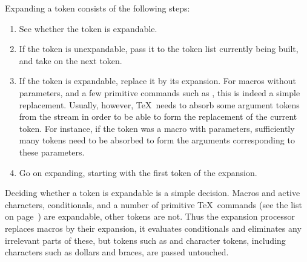 \documentclass[letterpaper]{book}
\begin{document}
Expanding a token consists of the following steps:
\begin{enumerate}
\item See whether the token is expandable. 
\item If the token is unexpandable, pass it to the token
      list currently being built, and take on the next token. 

\item If the token is expandable, replace it by its expansion.
      For macros without parameters, and a few primitive commands
      such as , this is indeed a simple replacement.
      Usually, however, \TeX\ needs to absorb some argument tokens from
      the stream in order to be able to form the replacement
      of the current token.
      For instance, if the token was a macro with parameters,
      sufficiently many tokens need to be absorbed to form
      the arguments corresponding to  these parameters.

\item Go on expanding, starting with the first token of the
      expansion. 
\end{enumerate}
%
Deciding whether a token is expandable is
a simple decision. Macros and active characters, 
conditionals, and a number of primitive \TeX\ commands
(see the list on page~\pageref{expand:lijst})
are expandable, other tokens are not.
Thus the expansion processor replaces macros by their expansion,
it evaluates conditionals and eliminates any irrelevant parts of 
these, but tokens such as  and character tokens,
including characters such as dollars and braces, are passed untouched.
\end{document}
